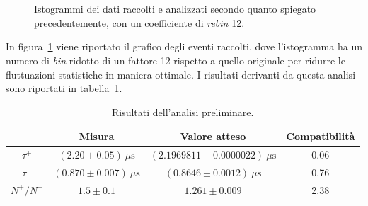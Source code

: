\documentclass[10pt, oneside, a4paper]{article}   	%
\begin{document}
%
\begin{figure}[h!]
\centering
{} \\
 \\
\caption{Istogrammi dei dati raccolti e analizzati secondo quanto spiegato precedentemente, con un coefficiente di \emph{rebin} 12.}
\label{fig::histo}
\end{figure}
%
In figura~\ref{fig::histo} viene riportato il grafico degli eventi raccolti, dove l'istogramma ha un numero di \emph{bin} ridotto di un fattore 12 rispetto a quello originale per ridurre le fluttuazioni statistiche in maniera ottimale. I risultati derivanti da questa analisi sono riportati in tabella~\ref{results}.
%
\begin{table}[H]
	\centering
	\begin{tabular}{cccc}
		\toprule
				& Misura	& Valore atteso 	& Compatibilità \\	
		\midrule
		$\tau^+$	& $(2.20 \pm 0.05) \ \mu \mbox{s}$ 	& $(2.1969811 \pm 0.0000022) \  \mu \mbox{s}$ 	& 0.06 	\\
		$\tau^-$	& $(0.870 \pm 0.007)  \ \mu \mbox{s}$ 	& $(0.8646 \pm 0.0012)  \ \mu \mbox{s}$ 		& 0.76	\\
		$N^+/N^-$	& $1.5 \pm 0.1$ 	& $1.261 \pm 0.009$ 		& 2.38	\\
		\bottomrule
	\end{tabular}
	\caption{Risultati dell'analisi preliminare.}
	\label{results}
\end{table}
\end{document}
